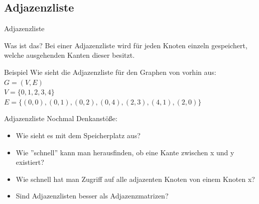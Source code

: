 	
	
	\subsection{Adjazenzliste}
	\begin{frame}{Adjazenzliste}
		\begin{block}{Was ist das?}
			Bei einer Adjazenzliste wird für jeden Knoten einzeln gespeichert, welche ausgehenden Kanten dieser besitzt.
		\end{block}
		
		\begin{exampleblock}{Beispiel}
			Wie sieht die Adjazenzliste für den Graphen von vorhin aus:\\
			$G = (V, E)$\\
			$V = \{0,1,2,3,4\}$\\
			$E = \{(0,0), (0,1), (0,2), (0,4), (2,3), (4,1), (2,0)\}$
		\end{exampleblock}
	\end{frame}
	
	
	\begin{frame}{Adjazenzliste}
		Nochmal Denkanstöße:
		\begin{itemize}
			\pause
			\item Wie sieht es mit dem Speicherplatz aus?
			
			\pause
			\item Wie ''schnell'' kann man herausfinden, ob eine Kante zwischen x und y existiert?
			
			\pause
			\item Wie schnell hat man Zugriff auf alle adjazenten Knoten von einem Knoten x?
			
			\pause
			\item Sind Adjazenzlisten besser als Adjazenzmatrizen?
			
		\end{itemize}
	\end{frame}
	
